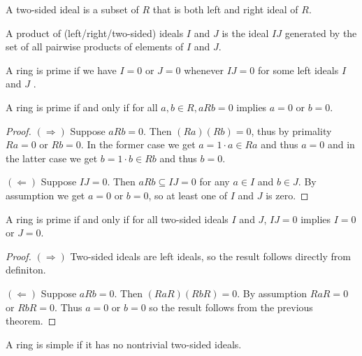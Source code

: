   \begin{definition}
    A two-sided ideal is a subset of $R$ that is both left and right ideal of $R$.
  \end{definition}

  \begin{definition}
    A product of (left/right/two-sided) ideals $I$ and $J$ is the ideal $IJ$ generated by the set of all pairwise products of elements of $I$ and $J$.
  \end{definition}

  \begin{definition}
    \leanok
    A ring is prime if we have $I = 0$ or $J = 0$ whenever $IJ = 0$ for some left ideals $I$ and $J$ .
  \end{definition}

  \begin{theorem}
    \label{thm:prime_ring_equiv}
    A ring is prime if and only if for all $a, b \in R, aRb = 0$ implies $a = 0$ or $b = 0$.
  \end{theorem}
  \begin{proof}
    $(\Rightarrow)$ Suppose $aRb = 0$. Then $(Ra)(Rb) = 0$, thus by primality $Ra = 0$ or $Rb = 0$. In the former case we get $a = 1 \cdot a \in Ra$ and thus $a = 0$ and in the latter case we get $b = 1 \cdot b \in Rb$ and thus $b = 0$.

    $(\Leftarrow)$ Suppose $IJ = 0$. Then $aRb  \subseteq IJ = 0$ for any $a \in I$ and $b \in J$. By assumption we get $a = 0$ or $b = 0$, so at least one of $I$ and $J$ is zero.
  \end{proof}
  \begin{theorem}
    \label{thm:prime_ring_equiv'}
    A ring is prime if and only if for all two-sided ideals $I$ and $J$, $IJ = 0$ implies $I = 0$ or $J = 0$.
  \end{theorem}
  \begin{proof}
    $(\Rightarrow)$ Two-sided ideals are left ideals, so the result follows directly from definiton.

    $(\Leftarrow)$ Suppose $aRb = 0$. Then $(RaR)(RbR) = 0$. By assumption $RaR = 0$ or $RbR = 0$. Thus $a = 0$ or $b = 0$ so the result follows from the previous theorem.
  \end{proof}

  \begin{definition}
    A ring is simple if it has no nontrivial two-sided ideals.
  \end{definition}

